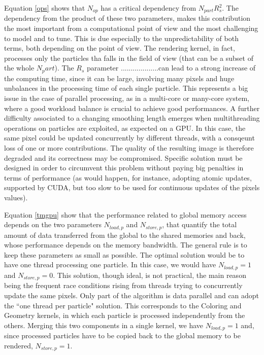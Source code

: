 \documentclass[11pt]{article}
\begin{document}
Equation \eqref{ops} shows that $N_{op}$ has a critical dependency from 
$N_{part} R_s^2$. The dependency from the product of these two parameters, makes 
this contribution the most important from a computational point of view and the most
challenging to model and to tune. This is due especially to the unpredictability of
both terms, both depending on the point of view. The rendering kernel, in fact,
processes only the particles tha falls in the field of view (that can be a subset
of the whole $N_part$).  
The $R_s$ parameter ...................can lead to a strong increase of the computing time, since 
it can be large, involving many pixels and huge unbalances in the processing 
time of each single particle. This
represents a big issue in the case of parallel processing, as in a multi-core or
many-core system, where a good workload balance is crucial to achieve good performances.
A further difficulty associated to a changing smoothing length emerges when 
multithreading operations on particles are exploited, as expected on a GPU. 
In this case, the same pixel could be updated concurrently by different threads,
with a consqeunt loss of one or more contributions.
The quality of the resulting image is therefore degraded and its correctness may be
compromised.
Specific solution must be designed in order to circumvent this problem 
without paying big penalties in terms of performance (as would happen, for instance,
adopting atomic updates, supported by CUDA, but too slow to be used for continuous 
updates of the pixels values).

Equation \eqref{tmgpu} show that the performance related to global memory access
depends on the two parameters $N_{load,p}$ and $N_{store,p}$, that quantify the 
total amount of data transferred from the global to the shared memories and back,
whose performance depends on the memory bandwidth.
The general rule is to keep these parameters
as small as possible. 
The optimal solution would be to have one thread 
processing one particle. In this case, we would have $N_{load,p} = 1$ and $N_{store,p} = 0$.
This solution, though ideal, is not practical, the main reason being the frequent race conditions 
rising from threads trying to concurrently update the same pixels.
Only part of the algorithm is data parallel and can adopt the ``one thread per particle" solution.
This corresponds to the Coloring and Geometry kernels, in which each particle 
is processed independently from the others. Merging this two components in a single
kernel, we have $N_{load,p} = 1$ and, since processed particles
have to be copied back to the global memory to be rendered, $N_{store,p} = 1$. 
\end{document}
